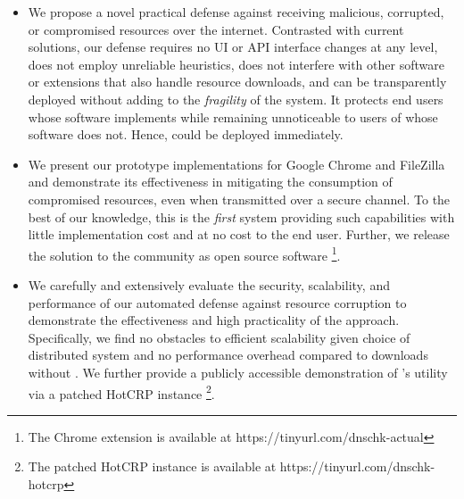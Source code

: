 \begin{itemize}

  \item We propose a novel practical defense against receiving malicious,
  corrupted, or compromised resources over the internet. Contrasted with current
  solutions, our defense requires no UI or API interface changes at any level,
  does not employ unreliable heuristics, does not interfere with other software
  or extensions that also handle resource downloads, and can be transparently
  deployed without adding to the \textit{fragility} of the system. It protects
  end users whose software implements \SYSTEM{} while remaining unnoticeable to
  users of whose software does not. Hence, \SYSTEM{} could be deployed
  immediately.

  \item We present our prototype \SYSTEM{} implementations for Google Chrome and
  FileZilla and demonstrate its effectiveness in mitigating the consumption of
  compromised resources, even when transmitted over a secure channel. To the
  best of our knowledge, this is the \emph{first} system providing such
  capabilities with little implementation cost and at no cost to the end user.
  Further, we release the \SYSTEM{} solution to the community as open source
  software \footnote{The Chrome extension is available at
  https://tinyurl.com/dnschk-actual}.

  \item We carefully and extensively evaluate the security, scalability, and
  performance of our automated defense against resource corruption to
  demonstrate the effectiveness and high practicality of the \SYSTEM{} approach.
  Specifically, we find no obstacles to efficient scalability given choice of
  distributed system and no performance overhead compared to downloads without
  \SYSTEM{}. We further provide a publicly accessible demonstration of
  \SYSTEM{}'s utility via a patched HotCRP instance \footnote{The patched HotCRP
  instance is available at https://tinyurl.com/dnschk-hotcrp}.

\end{itemize}
